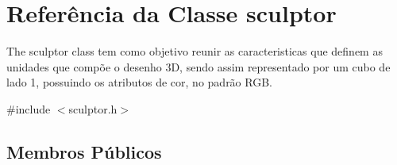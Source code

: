 \hypertarget{classsculptor}{}\section{Referência da Classe sculptor}
\label{classsculptor}


The sculptor class tem como objetivo reunir as caracteristicas que definem as unidades que compõe o desenho 3D, sendo assim representado por um cubo de lado 1, possuindo os atributos de cor, no padrão R\+GB.  




{\ttfamily \#include $<$sculptor.\+h$>$}

\subsection*{Membros Públicos}
